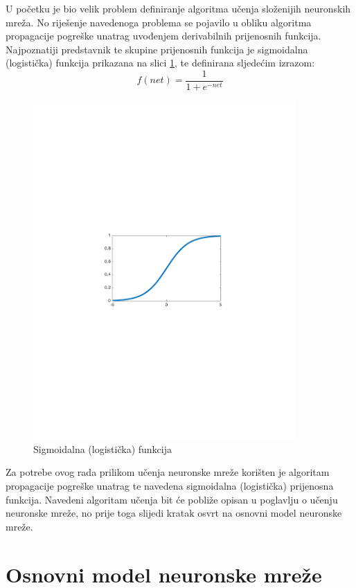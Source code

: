U početku je bio velik problem definiranje algoritma učenja složenijih neuronskih mreža. No riješenje navedenoga problema se pojavilo u obliku algoritma propagacije pogreške unatrag uvođenjem derivabilnih prijenosnih funkcija. Najpoznatiji predstavnik te skupine prijenosnih funkcija je sigmoidalna (logistička) funkcija prikazana na slici \ref{fig:sigmoidal}, te definirana sljedećim izrazom: $$f(net) = \frac{1}{1+e^{-net}}$$
\begin{figure}[htb]
    \centering
    \includegraphics[width=10cm]{images/sigmoidal.pdf}
    \caption{Sigmoidalna (logistička) funkcija}
    \label{fig:sigmoidal}
\end{figure}

Za potrebe ovog rada prilikom učenja neuronske mreže korišten je algoritam propagacije pogreške unatrag te navedena sigmoidalna (logistička) prijenosna funkcija. Navedeni algoritam učenja bit će pobliže opisan u poglavlju o učenju neuronske mreže, no prije toga slijedi kratak osvrt na osnovni model neuronske mreže.

\section{Osnovni model neuronske mreže}


